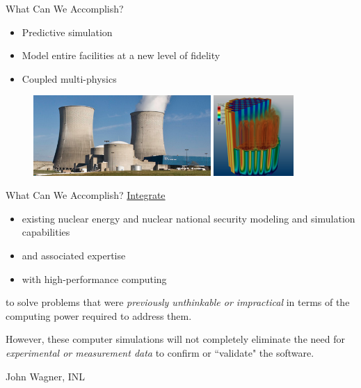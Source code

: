 \documentclass[xcolor=x11names]{beamer}
\begin{document}
\begin{frame}{What Can We Accomplish?}
\begin{itemize}
\item Predictive simulation 
\item Model entire facilities at a new level of fidelity
\item Coupled multi-physics
\end{itemize}
\begin{figure}
\includegraphics[height=1.2in,clip]{WattsBar}
\hfill
\includegraphics[height=1.2in,clip]{DenovoCore}
\end{figure}
\end{frame}


\begin{frame}{What Can We Accomplish?}
\underline{Integrate}
\begin{itemize}
\item existing nuclear energy and nuclear national security modeling and simulation capabilities
\item and associated expertise
\item with high-performance computing
\end{itemize}    
to solve problems that were \emph{previously unthinkable or impractical} in terms of the computing power required to address them.

\vspace*{1em}
However, these computer simulations will not completely eliminate the need for \emph{experimental or measurement data} to confirm or ``validate" the software. 

\vspace*{1em}
\hspace*{0.25 in} John Wagner, INL
\end{frame}
\end{document}

